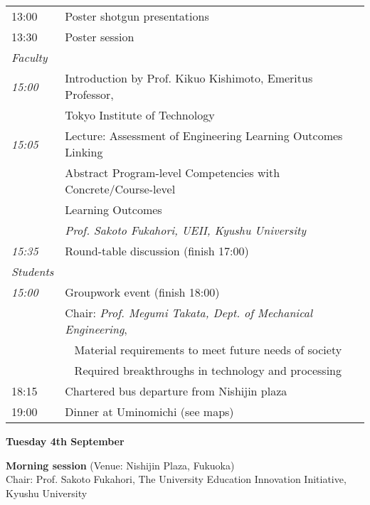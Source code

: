 \vspace{1em}
\noindent\begin{tabular}{|l|l|}
    \hline
    13:00   & Poster shotgun presentations \\
    13:30   & Poster session \\
    \hline
    \emph{Faculty} & \\
    \hspace{1em}\emph{15:00} & Introduction by Prof. Kikuo Kishimoto, Emeritus Professor, \\
                             & Tokyo Institute of Technology \\
    \hspace{1em}\emph{15:05} & Lecture: Assessment of Engineering Learning Outcomes Linking \\
                             & Abstract Program-level Competencies with Concrete/Course-level \\
                             & Learning Outcomes \\  
                             & \emph{Prof. Sakoto Fukahori,   UEII, Kyushu University} \\
    \hspace{1em}\emph{15:35} & Round-table discussion (finish 17:00) \\
    \hline
    \emph{Students} & \\
    \hspace{1em}\emph{15:00} & Groupwork event (finish 18:00) \\
            & Chair: {\em Prof. Megumi Takata, Dept. of Mechanical Engineering},\\
            & ~ Material requirements to meet future needs of society \\
            & ~ Required breakthroughs in technology and processing \\
    \hline
    18:15   & Chartered bus departure from Nishijin plaza \\
    19:00   & Dinner at Uminomichi (see maps) \\
    \hline
\end{tabular}

\newpage
\begin{center}
{\bf \large Tuesday 4th September}
\end{center}
\vspace*{3ex}
{\bf Morning session} (Venue: Nishijin Plaza, Fukuoka)\\
Chair: Prof. Sakoto Fukahori,  The University Education Innovation Initiative, Kyushu University

